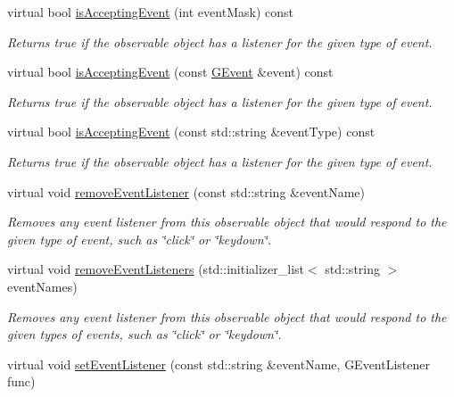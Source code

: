\begin{DoxyCompactItemize}
virtual bool \mbox{\hyperlink{classGObservable_aeec1adc19aa0f33de62390686ee1382c}{is\+Accepting\+Event}} (int event\+Mask) const
\begin{DoxyCompactList}\small\item\em Returns true if the observable object has a listener for the given type of event. \end{DoxyCompactList}\item 
virtual bool \mbox{\hyperlink{classGObservable_aa31c73145a29dcb92848a92e0cfaea41}{is\+Accepting\+Event}} (const \mbox{\hyperlink{classGEvent}{G\+Event}} \&event) const
\begin{DoxyCompactList}\small\item\em Returns true if the observable object has a listener for the given type of event. \end{DoxyCompactList}\item 
virtual bool \mbox{\hyperlink{classGObservable_a3b1c689267eda44e65a2213e7de38b23}{is\+Accepting\+Event}} (const std\+::string \&event\+Type) const
\begin{DoxyCompactList}\small\item\em Returns true if the observable object has a listener for the given type of event. \end{DoxyCompactList}\item 
virtual void \mbox{\hyperlink{classGObservable_acbcf1ed3a851ad8a3c17ef38d86b481d}{remove\+Event\+Listener}} (const std\+::string \&event\+Name)
\begin{DoxyCompactList}\small\item\em Removes any event listener from this observable object that would respond to the given type of event, such as \char`\"{}click\char`\"{} or \char`\"{}keydown\char`\"{}. \end{DoxyCompactList}\item 
virtual void \mbox{\hyperlink{classGObservable_af51cc35c29a1bd1908609d432decdbb6}{remove\+Event\+Listeners}} (std\+::initializer\+\_\+list$<$ std\+::string $>$ event\+Names)
\begin{DoxyCompactList}\small\item\em Removes any event listener from this observable object that would respond to the given types of events, such as \char`\"{}click\char`\"{} or \char`\"{}keydown\char`\"{}. \end{DoxyCompactList}\item 
virtual void \mbox{\hyperlink{classGObservable_ad2f6d34961c50f6c1e0659990b79f741}{set\+Event\+Listener}} (const std\+::string \&event\+Name, G\+Event\+Listener func)

\end{DoxyCompactItemize}
